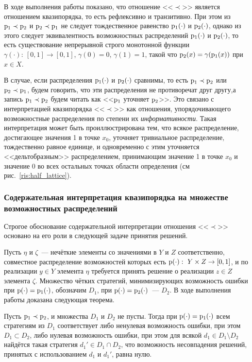 В ходе выполнения работы показано, что отношение <<$\prec$>> является отношением квазипорядка, то есть рефлексивно и транзитивно. При этом из ${\mathrm{p}}_1\prec{\mathrm{p}}_2$ и ${\mathrm{p}}_2\prec{\mathrm{p}}_1$ не следует тождественное равенство ${\mathrm{p}}_1(\cdot)$ и ${\mathrm{p}}_2(\cdot)$, однако из этого следует эквивалентность возможностных распределений ${\mathrm{p}}_1(\cdot)$ и ${\mathrm{p}}_2(\cdot)$, то есть существование непрерывной строго монотонной функции $\gamma(\cdot):\ [0,1]\to[0,1]$, $\gamma(0) = 0$, $\gamma(1) = 1$, такой что ${\mathrm{p}}_2(x) = \gamma({\mathrm{p}}_1(x))$ при $x\in X$.

В случае, если распределения ${\mathrm{p}}_1(\cdot)$ и ${\mathrm{p}}_2(\cdot)$ сравнимы, то есть ${\mathrm{p}}_1\prec{\mathrm{p}}_2$ или ${\mathrm{p}}_2\prec{\mathrm{p}}_1$, будем говорить, что эти распределения не противоречат друг другу,а запись ${\mathrm{p}}_1\prec{\mathrm{p}}_2$ будем читать как <<${\mathrm{p}}_1$ уточняет ${\mathrm{p}}_2$>>. Это связано с интерпретацией квазипорядка <<$\prec$>> как отношения, упорядочивающего возможностные распределения по степени их \emph{информативности}. Такая интерпретация может быть проиллюстрирована тем, что всякое распределение, достигающее значения 1 в точке $x_0$, уточняет тривиальное распределение, тождественно равное единице, и одновременно с этим уточняется <<дельтобразным>> распределением, принимающим значение 1 в точке $x_0$ и значение 0 во всех остальных точках области определения (см рис.~\ref{ris:half_lattice}).

\subsubsection{Содержательная интерпретация квазипорядка на множестве возможностных распределений}

Строгое обоснование содержательной интерпретации отношения <<$\prec$>> основано на его роли в следующей задаче принятия решений.

Пусть $\eta$ и $\zeta$~--- нечёткие элементы со значениями в $Y$ и $Z$ соответственно, совместное распределение возможностей которых есть ${\mathrm{p}}(\cdot):\ Y\times Z\to[0,1]$, и по реализации $y\in Y$ элемента $\eta$ требуется принять решение о реализации $z\in Z$ элемента $\zeta$. Множество чётких стратегий, минимизирующих возможность ошибки при ${\mathrm{p}}(\cdot) = {\mathrm{p}}_1(\cdot)$, обозначим $D_1$, при ${\mathrm{p}}(\cdot) = {\mathrm{p}}_2(\cdot)$~--- $D_2$.
В ходе выполнения работы доказана следующая теорема.

\begin{theorem}
\label{theorem_zubyuk}
    Пусть ${\mathrm{p}}_1\prec{\mathrm{p}}_2$, и множества $D_1$ и $D_2$ не пусты. Тогда при ${\mathrm{p}}(\cdot) = {\mathrm{p}}_1(\cdot)$ всем стратегиям из $D_1$ соответствует либо ненулевая возможность ошибки, при этом $D_1\subset D_2$, либо нулевая возможность ошибки, при этом для всякой $d_1\in D_1\setminus D_2$ найдётся такая стратегия $d_1'\in  D_1\cap D_2$, что возможность несовпадения решений, принятых с использованием $d_1$ и $d_1'$, равна нулю.
\end{theorem}

